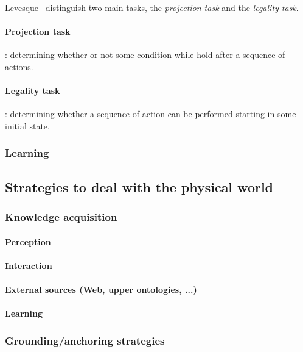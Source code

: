 \documentclass[a4paper]{article}
\begin{document}
Levesque~\cite{Levesque2007} distinguish two main tasks, the \emph{projection task} and the \emph{legality task}.

\paragraph{Projection task}: determining whether or not some condition while hold after a sequence of actions.

\paragraph{Legality task}: determining whether a sequence of action can be performed starting in some initial state.

\subsubsection{Learning}
\label{sect|learning}


\subsection{Strategies to deal with the physical world}

\subsubsection{Knowledge acquisition}
\label{sect|knowledge-acquisition}

\paragraph{Perception}
\paragraph{Interaction}
\paragraph{External sources (Web, upper ontologies, ...)}
\paragraph{Learning}

\subsubsection{Grounding/anchoring strategies}
\label{sect|grounding}
\end{document}
